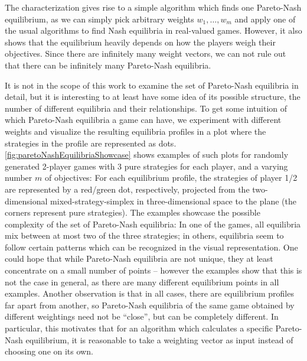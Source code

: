 \documentclass[a4paper]{scrreprt}
\theoremstyle{definition}
\begin{document}
    The characterization gives rise to a simple algorithm which finds one Pareto-Nash equilibrium, as we can simply pick arbitrary weights $w_1, \dots, w_m$ and apply one of the usual algorithms to find Nash equilibria in real-valued games.
    However, it also shows that the equilibrium heavily depends on how the players weigh their objectives. Since there are infinitely many weight vectors, we can not rule out that there can be infinitely many Pareto-Nash equilibria. 
    
    It is not in the scope of this work to examine the set of Pareto-Nash equilibria in detail, but it is interesting to at least have some idea of its possible structure, 
    the number of different equilibria and their relationships.
    To get some intuition of which Pareto-Nash equilibria a game can have, we experiment with different weights and visualize the resulting equilibria profiles in a plot where the strategies in the profile are represented as dots.
    \autoref{fig:paretoNashEquilibriaShowcase}
    shows examples of such plots for randomly generated 2-player games with 3 pure strategies for each player, and a varying number $m$ of objectives: For each equilibrium profile, the strategies of player 1/2 are represented by a red/green dot, respectively, projected from the two-dimensional mixed-strategy-simplex in three-dimensional space to the plane 
    (the corners represent pure strategies).
    The examples showcase the possible complexity of the set of Pareto-Nash equilibria:
    In one of the games, all equilibria mix between at most two of the three strategies; in others, equilibria seem to follow certain patterns which can be recognized in the visual representation.
    One could hope that while Pareto-Nash equilibria are not unique, they at least concentrate on a small number of points -- however the examples show that this is not the case in general, as there are many different equilibrium points in all examples.
    Another observation is that in all cases, there are equilibrium profiles far apart from another, so Pareto-Nash equilibria of the same game obtained by different weightings need not be “close”, but can be completely different.
    In particular, this motivates that for an algorithm which calculates a specific Pareto-Nash equilibrium, it is reasonable to take a weighting vector as input instead of choosing one on its own.
\end{document}

